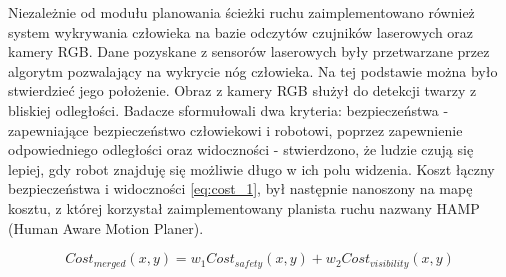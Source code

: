 Niezależnie od modułu planowania ścieżki ruchu zaimplementowano również system wykrywania człowieka na bazie odczytów czujników laserowych oraz kamery RGB. Dane pozyskane z sensorów laserowych były przetwarzane przez algorytm pozwalający na wykrycie nóg człowieka. Na tej podstawie można było stwierdzieć jego położenie. Obraz z kamery RGB służył do detekcji twarzy z bliskiej odległości.
\indent Badacze sformułowali dwa kryteria: bezpieczeństwa - zapewniające bezpieczeństwo człowiekowi i robotowi, poprzez zapewnienie odpowiedniego odległości oraz widoczności - stwierdzono, że ludzie czują się lepiej, gdy robot znajduję się możliwie długo w ich polu widzenia. Koszt łączny bezpieczeństwa i widoczności \eqref{eq:cost_1}, był następnie nanoszony na mapę kosztu, z której korzystał zaimplementowany planista ruchu nazwany HAMP (Human Aware Motion Planer).

\begin{figure}[h!t]
  	\centering 
  	\begin{equation} \label{eq:cost_1}
  	Cost_{merged}(x,y) = w_{1}Cost_{safety}(x,y) + w_{2}Cost_{visibility}(x,y)
  	\end{equation}   
\end{figure}

